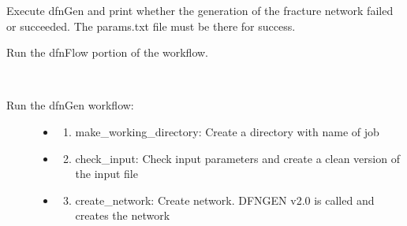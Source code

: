 \documentclass[letterpaper,10pt,english]{sphinxmanual}
\begin{document}
\begin{fulllineitems}
\begin{fulllineitems}
\end{fulllineitems}


\begin{fulllineitems}
\label{pydfnworks:pydfnworks.DFNWORKS.create_network}
Execute dfnGen and print whether the generation of the fracture network failed or succeeded. The params.txt file must be there for success.

\end{fulllineitems}


\begin{fulllineitems}
\label{pydfnworks:pydfnworks.DFNWORKS.dfnFlow}
Run the dfnFlow portion of the workflow.

\end{fulllineitems}


\begin{fulllineitems}
\label{pydfnworks:pydfnworks.DFNWORKS.dfnGen}~\begin{description}
\item[{Run the dfnGen workflow: }] \leavevmode\begin{itemize}
\item {} \begin{enumerate}
\item {} 
make\_working\_directory: Create a directory with name of job

\end{enumerate}

\item {} \begin{enumerate}
\setcounter{enumi}{1}
\item {} 
check\_input: Check input parameters and create a clean version of the input file

\end{enumerate}

\item {} \begin{enumerate}
\setcounter{enumi}{2}
\item {} 
create\_network: Create network. DFNGEN v2.0 is called and creates the network


\end{enumerate}
\end{itemize}
\end{description}
\end{fulllineitems}
\end{fulllineitems}
\end{document}
